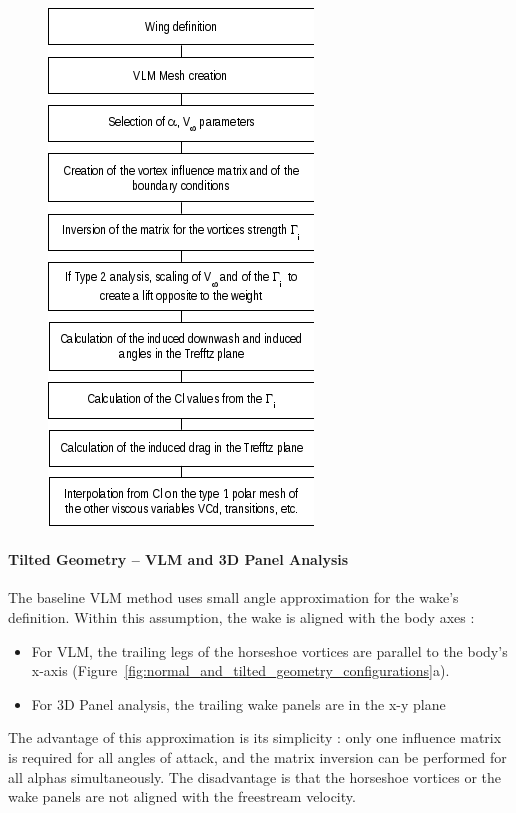 \documentclass[a4paper,twoside,12pt,dvips]{article}
\begin{document}
\begin{figure}[htbp]
  \includegraphics[width=0.5\linewidth]{dia-02}\centering 
\end{figure}

\paragraph{Tilted Geometry -- VLM and 3D Panel Analysis}
\label{sec:tilted_geometry}

The baseline VLM method uses small angle approximation for the wake's
definition. Within this assumption, the wake is aligned with the body
axes :

\begin{itemize}
\item For VLM, the trailing legs of the horseshoe vortices are
parallel to the body's x-axis (Figure~\ref{fig:normal_and_tilted_geometry_configurations}a).
\item For 3D Panel analysis, the trailing wake panels are in
the x-y plane
\end{itemize}

The advantage of this approximation is its simplicity : only one
influence matrix is required for all angles of attack, and the matrix
inversion can be performed for all alphas simultaneously.\newline
The disadvantage is that the horseshoe vortices or the wake panels are
not aligned with the freestream velocity.
\end{document}
